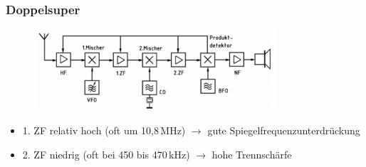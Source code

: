 \begin{frame}
  \frametitle{Doppelsuper}

  \begin{center}
    \begin{figure}
      \includegraphics[width=0.8\textwidth,height=.5\textheight,keepaspectratio]{a13/TF205b.png}
    \end{figure}
  \end{center}

  \begin{itemize}
    \item 1. ZF relativ hoch (oft um 10,8\,MHz) $\rightarrow$ gute Spiegelfrequenzunterdrückung
    \item 2. ZF niedrig (oft bei 450 bis 470\,kHz) $\rightarrow$ hohe Trennschärfe
  \end{itemize}
\end{frame}

